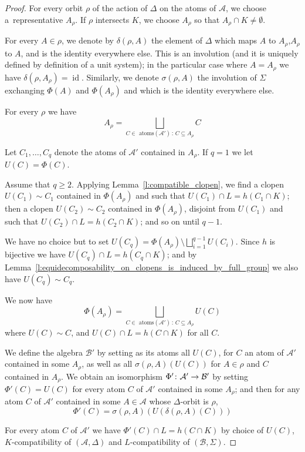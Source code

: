 \documentclass[AHL,Unicode]{cedram}
\DeclareMathOperator{\id}{id}
\newcommand{\mcA}{\mathcal{A}}
\newcommand{\mcB}{\mathcal{B}}
\renewcommand*{\to}{\mathchoice{\longrightarrow}{\rightarrow}{\rightarrow}{\rightarrow}}
\begin{document}
\begin{proof}
For every orbit $\rho$ of the action of $\Delta$ on the atoms of $\mcA$, we choose a~representative $A_\rho$. If $\rho$ intersects $K$, we choose $A_\rho$ so that $A_\rho \cap K \ne \emptyset$.

For every $A \in \rho$, we denote by $\delta(\rho,A)$ the element of $\Delta$ which maps $A$ to $A_\rho$,\linebreak $A_\rho$ to $A$, and is the identity everywhere else. This is an involution (and it is uniquely defined by definition of a unit system); in the particular case where $A=A_\rho$ we have $\delta(\rho,A_\rho)=\id$. Similarly, we denote $\sigma(\rho,A)$ the involution of $\Sigma$ exchanging $\Phi(A)$ and $\Phi(A_\rho)$ and which is the identity everywhere else.

For every $\rho$ we have
\[
A_\rho= \bigsqcup_{C \in \text{ atoms}(\mcA')\,:\,C \subseteq A_\rho} C
\]

Let $C_1,\dots,C_q$ denote the atoms of $\mcA'$ contained in $A_\rho$. If $q=1$ we let ${U(C)=\Phi(C)}$.

Assume that $q \ge 2$. Applying Lemma~\ref{l:compatible_clopen}, we find a clopen $U(C_1) \sim C_1$ contained in $\Phi(A_\rho)$ and such that $U(C_1) \cap L = h(C_1 \cap K)$; then a clopen $U(C_2) \sim C_2$ contained in $\Phi(A_\rho)$, disjoint from $U(C_1)$ and such that $U(C_2) \cap L = h(C_2 \cap K)$; and so on until $q-1$.

We have no choice but to set $U(C_q)= \Phi(A_\rho) \setminus \bigsqcup_{i=1}^{q-1} U(C_i)$. Since $h$ is bijective we have $U(C_q) \cap L= h(C_q \cap K)$; and by Lemma~\ref{l:equidecomposability_on_clopens_is_induced_by_full_group} we also have $U(C_q) \sim C_q$.

We now have
\[
\Phi(A_\rho) = \bigsqcup_{C \in \text{ atoms}(\mcA') \,:\,C \subseteq A_\rho} U(C)
\]
where $U(C) \sim C$, and $U(C) \cap L = h(C \cap K)$ for all $C$.

We define the algebra $\mcB'$ by setting as its atoms all $U(C)$, for $C$ an atom of $\mcA'$ contained in some $A_\rho$, as well as all $\sigma(\rho,A)(U(C))$ for $A \in \rho$ and $C$ contained in $A_\rho$. We obtain an isomorphism $\Phi' \colon \mcA' \to \mcB'$ by setting $\Phi'(C)=U(C)$ for every atom $C$ of $\mcA'$ contained in some $A_\rho$; and then for any atom $C$ of $\mcA'$ contained in some $A \in \mcA$ whose $\Delta$-orbit is $\rho$,
\[
\Phi'(C)= \sigma(\rho,A) (U(\delta(\rho,A)(C)))
\]

For every atom $C$ of $\mcA'$ we have $\Phi'(C) \cap L= h(C \cap K)$ by choice of $U(C)$, $K$-compatibility of $(\mcA,\Delta)$ and $L$-compatibility of $(\mcB,\Sigma)$.



\end{proof}
\end{document}
